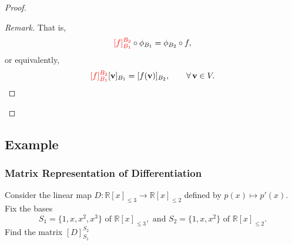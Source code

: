 \documentclass[12pt]{article}
\newenvironment{Remark}
{\begin{proof}[Remark]}
{\end{proof}}
\begin{document}
\begin{proof}
\begin{Remark}
That is,
\[
\textcolor{red}{[f]_{B_1}^{B_2}}\circ\phi_{B_1}=\phi_{B_2}\circ f,
\]
or equivalently,
\[
\textcolor{red}{[f]_{B_1}^{B_2}}[\mathbf{v}]_{B_1}=[f(\mathbf{v})]_{B_2},\qquad\forall\,\mathbf{v}\in V.
\]
\end{Remark}

\end{proof}

\subsection{Example}

\subsubsection{Matrix Representation of Differentiation}

Consider the linear map $D:\mathbb{R}[x]_{\le 3}\to \mathbb{R}[x]_{\le 2}$ defined by $p(x)\mapsto p'(x)$.
Fix the bases 
\[
S_1=\{1,x,x^2,x^3\}\text{ of }\mathbb{R}[x]_{\le 3},\text{ and } S_2=\{1,x,x^2\}\text{ of }\mathbb{R}[x]_{\le 2}.
\]
Find the matrix $[D]_{S_1}^{S_2}$
\end{document}
